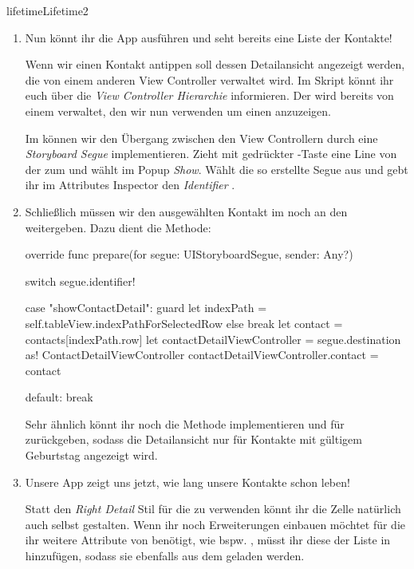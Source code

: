 \documentclass[parskip=half, final]{scrreprt}
\begin{document}
\begin{lecture}
\begin{exc}
\begin{excitem}{lifetime}{Lifetime}{2}
\begin{enumerate}
\item Nun könnt ihr die App ausführen und seht bereits eine Liste der Kontakte!

\mvcindicatorcontroller Wenn wir einen Kontakt antippen soll dessen Detailansicht angezeigt werden, die von einem anderen View Controller verwaltet wird. Im Skript könnt ihr euch über die \emph{View Controller Hierarchie} informieren. Der  wird bereits von einem  verwaltet, den wir nun verwenden um einen  anzuzeigen.

Im  können wir den Übergang zwischen den View Controllern durch eine \emph{Storyboard Segue} implementieren. Zieht mit gedrückter \keys{\ctrl}-Taste eine Line von der  zum  und wählt im Popup \emph{Show}. Wählt die so erstellte Segue aus und gebt ihr im Attributes Inspector den \emph{Identifier} .

\item Schließlich müssen wir den ausgewählten Kontakt im  noch an den  weitergeben. Dazu dient die  Methode:
\begin{swiftcode}
    override func prepare(for segue: UIStoryboardSegue, sender: Any?) {
        switch segue.identifier! {
            
        case "showContactDetail":
            guard let indexPath = self.tableView.indexPathForSelectedRow else { break }
            let contact = contacts[indexPath.row]
            let contactDetailViewController = segue.destination as! ContactDetailViewController
            contactDetailViewController.contact = contact
            
        default:
            break
        }
    }
\end{swiftcode}

Sehr ähnlich könnt ihr noch die  Methode implementieren und für   zurückgeben, sodass die Detailansicht nur für Kontakte mit gültigem Geburtstag angezeigt wird.

\item Unsere App zeigt uns jetzt, wie lang unsere Kontakte schon leben!

Statt den \emph{Right Detail} Stil für die  zu verwenden könnt ihr die Zelle natürlich auch selbst gestalten. Wenn ihr noch Erweiterungen einbauen möchtet für die ihr weitere Attribute von  benötigt, wie bspw. , müsst ihr diese der Liste  in  hinzufügen, sodass sie ebenfalls aus dem  geladen werden.


\end{enumerate}
\end{excitem}
\end{exc}
\end{lecture}
\end{document}
